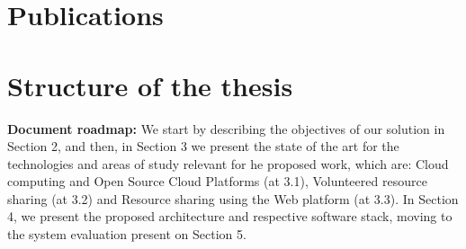\section{Publications}

\section{Structure of the thesis}

\textbf{Document roadmap:} We start by describing the objectives of our solution in Section 2, and then, in Section 3 we present the state of the art for the technologies and areas of study relevant for he proposed work, which are: Cloud computing and Open Source Cloud Platforms (at 3.1), Volunteered resource sharing (at 3.2) and Resource sharing using the Web platform (at 3.3). In Section 4, we present the proposed architecture and respective software stack, moving to the system evaluation present on Section 5.



